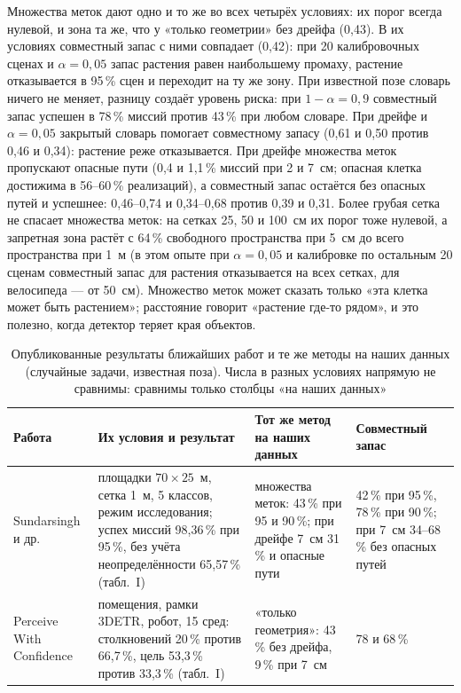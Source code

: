 Множества меток дают одно и то же во всех четырёх условиях: их порог всегда нулевой, и зона та же, что у «только геометрии» без дрейфа (0,43). В их условиях совместный запас с ними совпадает (0,42): при 20 калибровочных сценах и $\alpha = 0{,}05$ запас растения равен наибольшему промаху, растение отказывается в 95\,\% сцен и переходит на ту же зону. При известной позе словарь ничего не меняет, разницу создаёт уровень риска: при $1 - \alpha = 0{,}9$ совместный запас успешен в 78\,\% миссий против 43\,\% при любом словаре. При дрейфе и $\alpha = 0{,}05$ закрытый словарь помогает совместному запасу (0,61 и 0,50 против 0,46 и 0,34): растение реже отказывается. При дрейфе множества меток пропускают опасные пути (0,4 и 1,1\,\% миссий при 2 и 7~см; опасная клетка достижима в 56--60\,\% реализаций), а совместный запас остаётся без опасных путей и успешнее: 0,46--0,74 и 0,34--0,68 против 0,39 и 0,31. Более грубая сетка не спасает множества меток: на сетках 25, 50 и 100~см их порог тоже нулевой, а запретная зона растёт с 64\,\% свободного пространства при 5~см до всего пространства при 1~м (в этом опыте при $\alpha = 0{,}05$ и калибровке по остальным 20 сценам совместный запас для растения отказывается на всех сетках, для велосипеда --- от 50~см). Множество меток может сказать только «эта клетка может быть растением»; расстояние говорит «растение где-то рядом», и это полезно, когда детектор теряет края объектов.

\begin{table}[htbp]
\centering\scriptsize\setlength{\tabcolsep}{3pt}
\caption{Опубликованные результаты ближайших работ и те же методы на наших данных (случайные задачи, известная поза). Числа в разных условиях напрямую не сравнимы: сравнимы только столбцы «на наших данных»}
\label{tab:published}
\begin{tabular}{p{2.6cm}p{3.6cm}p{3.6cm}p{3.0cm}}
\toprule
Работа & Их условия и результат & Тот же метод на наших данных & Совместный запас \\
\midrule
Sundarsingh и др.~\cite{sundarsingh} & площадки $70\times25$~м, сетка 1~м, 5 классов, режим исследования; успех миссий 98,36\,\% при 95\,\%, без учёта неопределённости 65,57\,\% (табл.~I) & множества меток: 43\,\% при 95 и 90\,\%; при дрейфе 7~см 31\,\% и опасные пути & 42\,\% при 95\,\%, 78\,\% при 90\,\%; при 7~см 34--68\,\% без опасных путей \\
Perceive With Confidence~\cite{pwc} & помещения, рамки 3DETR, робот, 15 сред: столкновений 20\,\% против 66,7\,\%, цель 53,3\,\% против 33,3\,\% (табл.~I) & «только геометрия»: 43\,\% без дрейфа, 9\,\% при 7~см & 78 и 68\,\% \\
\bottomrule
\end{tabular}
\end{table}


